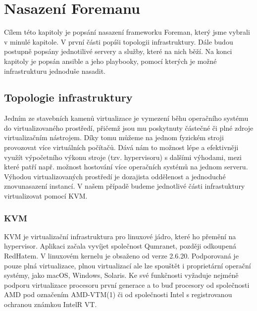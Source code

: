 \documentclass[thesis=B,czech]{FITthesis}[2012/06/26]
\begin{document}
\chapter{Nasazení Foremanu}

Cílem této kapitoly je popsání nasazení frameworku Foreman, který jsme vybrali v minulé kapitole. V první části popíši topologii infrastruktury. Dále budou postupně popsány jednotilivé servery a služby, které na nich běží. Na konci kapitoly je popsán ansible a jeho playbooky, pomocí kterých je možné infrastrukturu jednoduše nasadit. 

\section{Topologie infrastruktury}

Jedním ze stavebních kamenů virtualizace je vymezení běhu operačního systému do virtualizovaného prostředí, přičemž jsou mu poskytnuty částečné či plné zdroje virtualizačním nástrojem. Díky tomu můžeme na jednom fyzickém stroji provozovat více virtuálních počítačů. Dává nám to možnost lépe a efektivněji využít výpočetního výkonu stroje (tzv. hypervisoru) s dalšími výhodami, mezi které patří např. možnost hostování více operačních systémů na jednom serveru.
Výhodou virtualizovaných prostředí je dozajista oddělenost a jednoduché znovunasazení instancí. V našem případě budeme jednotlivé části infrastuktury virtualizovat pomocí KVM.


\subsection{KVM}


KVM je virtualizační infrastruktura pro linuxové jádro, které ho přemění na hypervisor. Aplikaci začala vyvíjet společnost Qumranet, později odkoupená RedHatem. V linuxovém kernelu je obsaženo od verze 2.6.20. Podporovaná je pouze plná virtualizace, plnou virtualizací ale lze spouštět i proprietární operační systémy, jako macOS, Windows, Solaris. Ke své funkčnosti vyžaduje nejméně podporu virtualizace procesoru první generace a to buď procesory od společnosti AMD pod označením AMD-VTM(1) či od společnosti Intel s registrovanou ochranou známkou IntelR VT.
\end{document}
